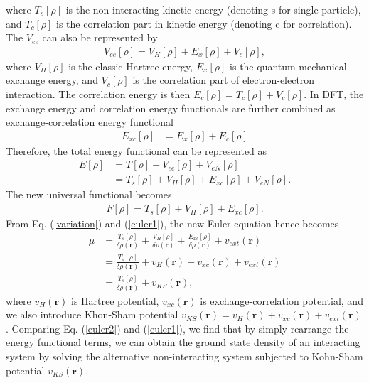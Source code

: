 where $T_s[\rho]$ is the non-interacting kinetic energy (denoting s for single-particle), and $T_c[\rho]$ is the correlation part in kinetic energy (denoting c for correlation). The $V_{ee}$ can also be represented by
	\begin{equation}
	\begin{aligned}
        V_{ee}[\rho] = V_H[\rho] + E_{x}[\rho] + V_{c}[\rho],
    \end{aligned}
	\end{equation}
where $V_H[\rho]$ is the classic Hartree energy, $E_{x}[\rho]$ is the quantum-mechanical exchange energy, and $V_{c}[\rho]$ is the correlation part of electron-electron interaction. The correlation energy is then $E_{c}[\rho] = T_{c}[\rho] + V_{c}[\rho]$. In DFT, the exchange energy and correlation energy functionals are further combined as exchange-correlation energy functional
	\begin{equation}
	\label{Exc}
	\begin{aligned}
        E_{xc}[\rho] &= E_{x}[\rho] + E_{c}[\rho]
    \end{aligned}
	\end{equation}
Therefore, the total energy functional can be represented as
	\begin{equation}
	\begin{aligned}
        E[\rho] &= T[\rho] + V_{ee}[\rho] + V_{eN}[\rho] \\  &= T_s[\rho] + V_H[\rho] + E_{xc}[\rho] +            V_{eN}[\rho].
    \end{aligned}
	\end{equation}
The new universal functional becomes
	\begin{equation}
	\begin{aligned}
        F[\rho] = T_s[\rho] + V_H[\rho] + E_{xc}[\rho].
    \end{aligned}
	\end{equation}
From Eq. (\ref{variation}) and (\ref{euler1}), the new Euler equation hence becomes
	\begin{equation}
	\label{euler2}
	\begin{aligned}
        \mu &= \frac {T_s[\rho]}{\delta \rho(\textbf{r})} + \frac {V_H[\rho]}{\delta \rho(\textbf{r})} +
       \frac {E_{xc}[\rho]}{\delta \rho(\textbf{r})} + v_{ext}(\textbf{r}) \\ &= \frac {T_s[\rho]}{\delta \rho(\textbf{r})} + v_H(\textbf{r}) + v_{xc}(\textbf{r}) + v_{ext}(\textbf{r}) \\
       &= \frac {T_s[\rho]}{\delta \rho(\textbf{r})} + v_{KS}(\textbf{r}),
    \end{aligned}
	\end{equation}
where $v_{H}(\textbf{r})$ is Hartree potential, $v_{xc}(\textbf{r})$ is exchange-correlation potential, and we also introduce Khon-Sham potential $v_{KS}(\textbf{r}) = v_{H}(\textbf{r})+ v_{xc}(\textbf{r}) + v_{ext}(\textbf{r})$. Comparing Eq. (\ref{euler2}) and (\ref{euler1}), we find that 
by simply rearrange the energy functional terms, we can obtain the ground state density of an interacting system by solving the alternative non-interacting system subjected to Kohn-Sham potential $v_{KS}(\textbf{r})$.

